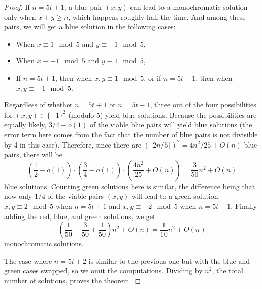 \begin{proof}
If $n = 5t \pm 1$, a blue pair $(x,y)$ can lead to a monochromatic solution only 
when $x + y \geq n$, which happens roughly half the time. And among these pairs, 
we will get a blue solution in the following cases:
\begin{itemize}
    \item When $x \equiv 1 \mod 5$ and $y \equiv -1 \mod 5$, 
    \item When $x \equiv -1 \mod 5$ and $y \equiv 1 \mod 5$,
    \item If $n = 5t + 1$, then when $x, y \equiv 1 \mod 5$, or if $n = 5t - 1$, then when $x, y \equiv -1 \mod 5$.
\end{itemize}
Regardless of whether $n = 5t + 1$ or $n = 5t - 1$, three out of the four possibilities for $(x,y) \in \{\pm 1\}^2$ (modulo 5) yield blue solutions. Because the possibilities are equally likely, $3/4 - o(1)$ of the viable blue pairs will yield blue solutions (the error term here comes from the fact that the number of blue pairs is not divisible by 4 in this case).
Therefore, since there are $(\lceil 2n/5 \rceil)^2 = 4n^2/25 + O(n)$ blue pairs, there will be 
\begin{equation}
\left(\frac{1}{2} - o(1)\right)\cdot\left(\frac{3}{4} - o(1)\right)\cdot\left(\frac{4n^2}{25} + O(n)\right) = \frac{3}{50}n^2 + O(n)
\end{equation}
blue solutions.
Counting green solutions here is similar, the difference being that now only $1/4$ of the
viable pairs $(x,y)$ will lead to a green solution: $x,y \equiv 2 \mod 5$ when $n = 5t + 1$ and $x,y \equiv -2 \mod 5$ when $n = 5t - 1$.
Finally adding the red, blue, and green solutions, we get
\begin{equation}
\left(\frac{1}{50} + \frac{3}{50} + \frac{1}{50}\right)n^2 + O(n) = \frac{1}{10}n^2 + O(n)
\end{equation}
monochromatic solutions.

The case where $n = 5t \pm 2$ is similar to the previous one but with the blue and green cases swapped, so we omit the computations.
Dividing by $n^2$, the total number of solutions, proves the theorem.
\end{proof}

